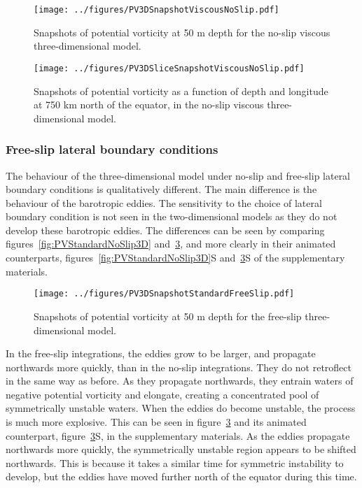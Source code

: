 \begin{figure} 
    \centering
    \texttt{[image: ../figures/PV3DSnapshotViscousNoSlip.pdf]}
    \caption{Snapshots of potential vorticity at 50 m depth for the no-slip viscous three-dimensional model.}
    \label{fig:PV3DSnapshotViscousNoSlip}
\end{figure}

\begin{figure} 
    \centering
    \texttt{[image: ../figures/PV3DSliceSnapshotViscousNoSlip.pdf]}
    \caption{Snapshots of potential vorticity as a function of depth and longitude at 750 km north of the equator, in the no-slip viscous three-dimensional model.}
    \label{fig:PVatFixedLatForViscous3D}
\end{figure}

\subsubsection{Free-slip lateral boundary conditions}
The behaviour of the three-dimensional model under no-slip and free-slip lateral boundary conditions is qualitatively different. The main difference is the behaviour of the barotropic eddies. The sensitivity to the choice of lateral boundary condition is not seen in the two-dimensional models as they do not develop these barotropic eddies. The differences can be seen by comparing figures~\ref{fig:PVStandardNoSlip3D} and~\ref{fig:PV3DSnapshotStandardFreeSlip}, and more clearly in their animated counterparts, figures~\ref{fig:PVStandardNoSlip3D}S and~\ref{fig:PV3DSnapshotStandardFreeSlip}S of the supplementary materials. 

\begin{figure} 
    \centering
    \texttt{[image: ../figures/PV3DSnapshotStandardFreeSlip.pdf]}
    \caption{Snapshots of potential vorticity at 50 m depth for the free-slip three-dimensional model.}
    \label{fig:PV3DSnapshotStandardFreeSlip}
\end{figure}

In the free-slip integrations, the eddies grow to be larger, and propagate northwards more quickly, than in the no-slip integrations. They do not retroflect in the same way as before. As they propagate northwards, they entrain waters of negative potential vorticity and elongate, creating a concentrated pool of symmetrically unstable waters. When the eddies do become unstable, the process is much more explosive. This can be seen in figure~\ref{fig:PV3DSnapshotStandardFreeSlip} and its animated counterpart, figure~\ref{fig:PV3DSnapshotStandardFreeSlip}S, in the supplementary materials. As the eddies propagate northwards more quickly, the symmetrically unstable region appears to be shifted northwards. This is because it takes a similar time for symmetric instability to develop, but the eddies have moved further north of the equator during this time.

